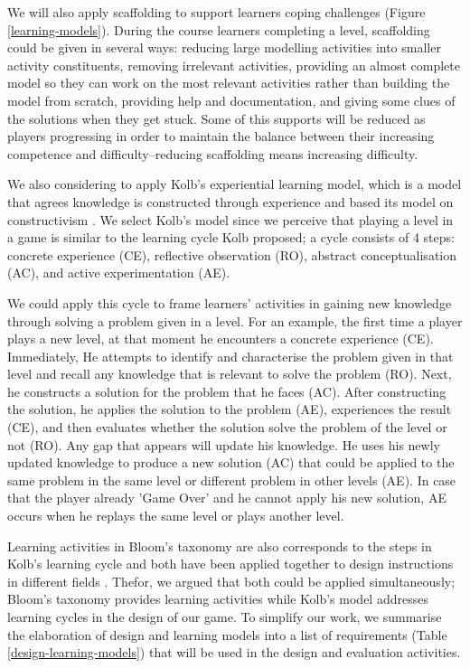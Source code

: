 \documentclass[12pt, a4paper]{report}
\begin{document}
We will also apply scaffolding \cite{vygotsky1978mind, wood1976role} to support learners coping challenges (Figure \ref{learning-models}). During the course learners completing a level, scaffolding could be given in several ways: reducing large modelling activities into smaller activity constituents, removing irrelevant activities, providing an almost complete model so they can work on the most relevant activities rather than building the model from scratch, providing help and documentation, and giving some clues of the solutions when they get stuck. Some of this supports will be reduced as players progressing in order to maintain the balance between their increasing competence and difficulty--reducing scaffolding means increasing difficulty.  

We also considering to apply Kolb's experiential learning model, which is a model that agrees knowledge is constructed through experience and based its model on constructivism \cite{kolb2014experiential}. We select Kolb's model since we perceive that playing a level in a game is similar to the learning cycle Kolb proposed; a cycle consists of 4 steps: concrete experience (CE), reflective observation (RO), abstract conceptualisation (AC), and active experimentation (AE). 

We could apply this cycle to frame learners' activities in gaining new knowledge through solving a problem given in a level. For an example, the first time a player plays a new level, at that moment he encounters a concrete experience (CE). Immediately, He attempts to identify and characterise the problem given in that level and recall any knowledge that is relevant to solve the problem (RO). Next, he constructs a solution for the problem that he faces (AC). After constructing the solution, he applies the solution to the problem (AE), experiences the result (CE), and then evaluates whether the solution solve the problem of the level or not (RO). Any gap that appears will update his knowledge. He uses his newly updated knowledge to produce a new solution (AC) that could be applied to the same problem in the same level or different problem in other levels (AE). In case that the player already 'Game Over' and he cannot apply his new solution, AE occurs when he replays the same level or plays another level.

Learning activities in Bloom's taxonomy are also corresponds to the steps in Kolb's learning cycle \cite{murphy2007prior} and both have been applied together to design instructions in different fields \cite{terry1993kolb, howard1996felder, schatzberg2002applying}. Thefor, we argued that both could be applied simultaneously; Bloom's taxonomy provides learning activities while Kolb's model addresses learning cycles in the design of our game. To simplify our work, we summarise the elaboration of design and learning models into a list of requirements (Table \ref{design-learning-models}) that will be used in the design and evaluation activities.
\end{document}
